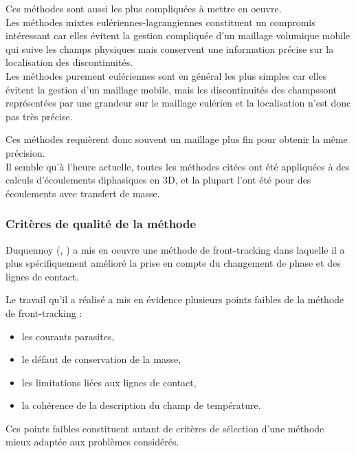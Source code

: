 Ces m\'ethodes sont aussi les plus compliqu\'ees à mettre en oeuvre.\\

Les m\'ethodes mixtes eul\'eriennes-lagrangiennes constituent un compromis int\'eressant
car elles \'evitent la gestion compliqu\'ee d'un maillage volumique mobile qui suive
les champs physiques mais conservent une information pr\'ecise sur la localisation des discontinuit\'es.\\

Les m\'ethodes purement eul\'eriennes sont en g\'en\'eral les plus simples
car elles \'evitent la gestion d'un maillage mobile,
mais les discontinuit\'es des champssont repr\'esent\'ees par une grandeur sur le maillage eul\'erien
et la localisation n'est donc pas très pr\'ecise.

Ces m\'ethodes requi\`erent donc souvent un maillage plus fin pour obtenir la même pr\'ecision.\\

Il semble qu'\`a l'heure actuelle, toutes les m\'ethodes cit\'ees
ont \'et\'e appliqu\'ees \`a des calculs d'\'ecoulements diphasiques en 3D,
et la plupart l'ont \'et\'e pour des \'ecoulements avec transfert de masse.


\subsubsection{Critères de qualit\'e de la m\'ethode}
Duquennoy (\cite{Duquennoy2000}, \cite{Duquennoy2000_2}) a mis en oeuvre une m\'ethode de front-tracking
dans laquelle il a plus sp\'ecifiquement am\'elior\'e la prise en compte
du changement de phase et des lignes de contact.

Le travail qu'il a r\'ealis\'e a mis en \'evidence plusieurs points faibles de la m\'ethode de front-tracking :
\begin{itemize}
  \item les courants parasites,
  \item le d\'efaut de conservation de la masse,
  \item les limitations li\'ees aux lignes de contact,
  \item la coh\'erence de la description du champ de temp\'erature.
\end{itemize}

Ces points faibles constituent autant de crit\`eres de s\'election d'une m\'ethode
mieux adapt\'ee aux problèmes consid\'er\'es.
\smallskip \\

